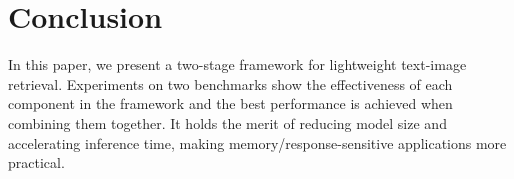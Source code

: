 \section{Conclusion}
In this paper, we present a two-stage framework for lightweight text-image retrieval. Experiments on two benchmarks show the effectiveness of each component in the framework and the best performance is achieved when combining them together. It holds the merit of reducing model size and accelerating inference time, making memory/response-sensitive applications more practical.